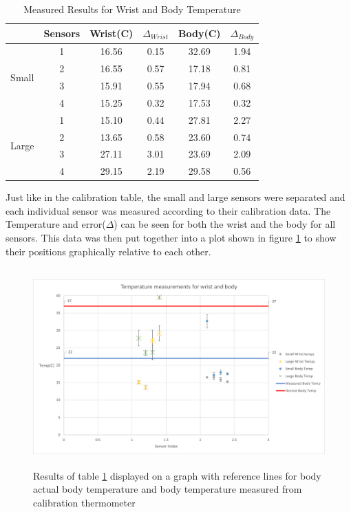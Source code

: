 \documentclass[12pt,a4paper]{report}
\begin{document}
\begin{table}[h!]
    \centering
    \caption{Measured Results for Wrist and Body Temperature}
    \label{tab:MeasuredResults}
    \begin{tabular}{|c|c|c|c|c|c|}
        \hline
        & Sensors & Wrist(C) & $\Delta_{Wrist}$ & Body(C) & $\Delta_{Body}$   \\
        \hline
        \multirow{4}{*}{Small} & 1 & 16.56 & 0.15 & 32.69 & 1.94 \\
        & 2 & 16.55 & 0.57 & 17.18 & 0.81 \\
        & 3 & 15.91 & 0.55 & 17.94 & 0.68 \\
        & 4 & 15.25 & 0.32 & 17.53 & 0.32 \\
        \hline
        \multirow{4}{*}{Large}& 1 & 15.10 & 0.44 & 27.81 & 2.27\\
        & 2 & 13.65 & 0.58 & 23.60 & 0.74 \\
        & 3 & 27.11 & 3.01 & 23.69 & 2.09 \\
        & 4 & 29.15 & 2.19 & 29.58 & 0.56 \\
        \hline
    \end{tabular}
\end{table}

Just like in the calibration table, the small and large sensors were separated and each individual sensor was measured according to their calibration data. The Temperature and error($\Delta$) can be seen for both the wrist and the body for all sensors. This data was then put together into a plot shown in figure \ref{fig:ResultsPlot} to show their positions graphically relative to each other. 

\begin{figure}[h!]
    \centering
    \includegraphics[height = 3in]{Images/Results.png}
    \caption{Results of table \ref{tab:MeasuredResults} displayed on a graph with reference lines for body actual body temperature and body temperature measured from calibration thermometer}
    \label{fig:ResultsPlot}
\end{figure}
\end{document}
